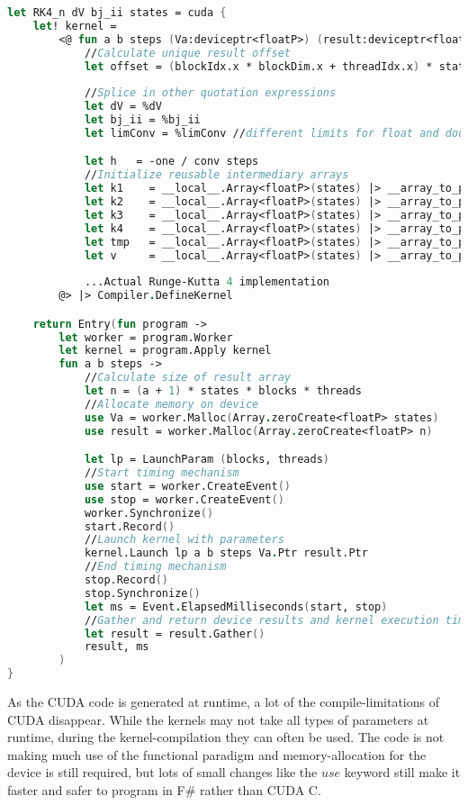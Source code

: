 \begin{lstlisting}[language=FSharp, caption=The Runge-Kutta 4 solver expressed in F\# Alea.cuBase, label=cubase_rk4_n_snippet]
let RK4_n dV bj_ii states = cuda {
	let! kernel =
		<@ fun a b steps (Va:deviceptr<floatP>) (result:deviceptr<floatP>) ->
			//Calculate unique result offset
			let offset = (blockIdx.x * blockDim.x + threadIdx.x) * states * (a + 1)
            
			//Splice in other quotation expressions
			let dV = %dV
			let bj_ii = %bj_ii
			let limConv = %limConv //different limits for float and double

			let h   = -one / conv steps
			//Initialize reusable intermediary arrays
			let k1	  = __local__.Array<floatP>(states) |> __array_to_ptr
			let k2	  = __local__.Array<floatP>(states) |> __array_to_ptr
			let k3	  = __local__.Array<floatP>(states) |> __array_to_ptr
			let k4	  = __local__.Array<floatP>(states) |> __array_to_ptr
			let tmp	  = __local__.Array<floatP>(states) |> __array_to_ptr
			let v	  = __local__.Array<floatP>(states) |> __array_to_ptr
            
            ...Actual Runge-Kutta 4 implementation
        @> |> Compiler.DefineKernel 

    return Entry(fun program ->
        let worker = program.Worker
        let kernel = program.Apply kernel
        fun a b steps ->
            //Calculate size of result array
            let n = (a + 1) * states * blocks * threads
			//Allocate memory on device
            use Va = worker.Malloc(Array.zeroCreate<floatP> states)
            use result = worker.Malloc(Array.zeroCreate<floatP> n)

            let lp = LaunchParam (blocks, threads)
            //Start timing mechanism
            use start = worker.CreateEvent()
            use stop = worker.CreateEvent()
            worker.Synchronize()
            start.Record()
            //Launch kernel with parameters
            kernel.Launch lp a b steps Va.Ptr result.Ptr
            //End timing mechanism
            stop.Record()
            stop.Synchronize()
            let ms = Event.ElapsedMilliseconds(start, stop)
            //Gather and return device results and kernel execution time
            let result = result.Gather()
            result, ms
        )
}
\end{lstlisting}

As the CUDA code is generated at runtime, a lot of the compile-limitations of CUDA disappear.
While the kernels may not take all types of parameters at runtime, during the kernel-compilation they can often be used.
The code is not making much use of the functional paradigm and memory-allocation for the device is still required, but lots of small changes like the $use$ keyword still make it faster and safer to program in F\# rather than CUDA C.

